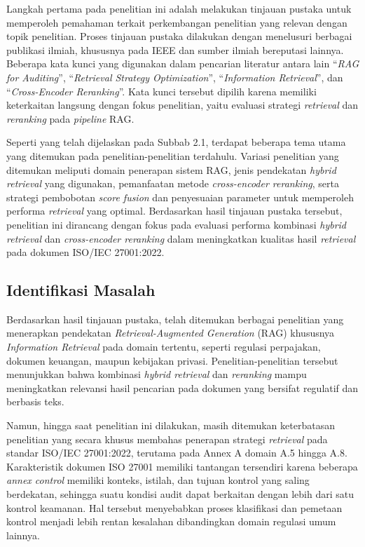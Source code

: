 Langkah pertama pada penelitian ini adalah melakukan tinjauan pustaka untuk memperoleh pemahaman terkait perkembangan penelitian yang relevan dengan topik penelitian. Proses tinjauan pustaka dilakukan dengan menelusuri berbagai publikasi ilmiah, khususnya pada IEEE dan sumber ilmiah bereputasi lainnya. Beberapa kata kunci yang digunakan dalam pencarian literatur antara lain ``\textit{RAG for Auditing}'', ``\textit{Retrieval Strategy Optimization}'', ``\textit{Information Retrieval}'', dan ``\textit{Cross-Encoder Reranking}''. Kata kunci tersebut dipilih karena memiliki keterkaitan langsung dengan fokus penelitian, yaitu evaluasi strategi \textit{retrieval} dan \textit{reranking} pada \textit{pipeline} RAG.

Seperti yang telah dijelaskan pada Subbab 2.1, terdapat beberapa tema utama yang ditemukan pada penelitian-penelitian terdahulu. Variasi penelitian yang ditemukan meliputi domain penerapan sistem RAG, jenis pendekatan \textit{hybrid retrieval} yang digunakan, pemanfaatan metode \textit{cross-encoder reranking}, serta strategi pembobotan \textit{score fusion} dan penyesuaian parameter untuk memperoleh performa \textit{retrieval} yang optimal. Berdasarkan hasil tinjauan pustaka tersebut, penelitian ini dirancang dengan fokus pada evaluasi performa kombinasi \textit{hybrid retrieval} dan \textit{cross-encoder reranking} dalam meningkatkan kualitas hasil \textit{retrieval} pada dokumen ISO/IEC 27001:2022.

\subsection{Identifikasi Masalah}

Berdasarkan hasil tinjauan pustaka, telah ditemukan berbagai penelitian yang menerapkan pendekatan \textit{Retrieval-Augmented Generation} (RAG) khususnya \textit{Information Retrieval} pada domain tertentu, seperti regulasi perpajakan, dokumen keuangan, maupun kebijakan privasi. Penelitian-penelitian tersebut menunjukkan bahwa kombinasi \textit{hybrid retrieval} dan \textit{reranking} mampu meningkatkan relevansi hasil pencarian pada dokumen yang bersifat regulatif dan berbasis teks.

Namun, hingga saat penelitian ini dilakukan, masih ditemukan keterbatasan penelitian yang secara khusus membahas penerapan strategi \textit{retrieval} pada standar ISO/IEC 27001:2022, terutama pada Annex A domain A.5 hingga A.8. Karakteristik dokumen ISO 27001 memiliki tantangan tersendiri karena beberapa \textit{annex control} memiliki konteks, istilah, dan tujuan kontrol yang saling berdekatan, sehingga suatu kondisi audit dapat berkaitan dengan lebih dari satu kontrol keamanan. Hal tersebut menyebabkan proses klasifikasi dan pemetaan kontrol menjadi lebih rentan kesalahan dibandingkan domain regulasi umum lainnya.

